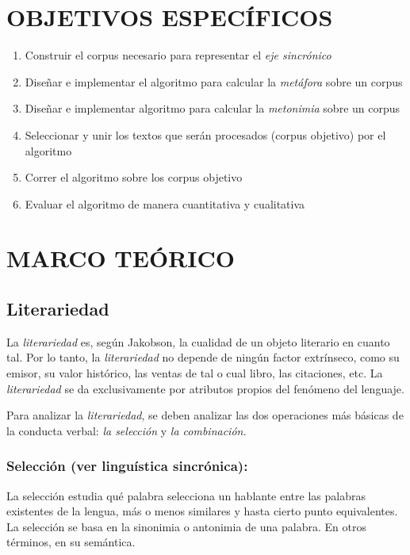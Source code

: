 \documentclass[twoside]{article}
\begin{document}
\section{OBJETIVOS ESPECÍFICOS}
\label{sec:org8cae7c8}

\begin{enumerate}
\item Construir el corpus necesario para representar el \emph{eje sincrónico}
\item Diseñar e implementar el algoritmo para calcular la \emph{metáfora} sobre un corpus
\item Diseñar e implementar algoritmo para calcular la \emph{metonimia} sobre un corpus
\item Seleccionar y unir los textos que serán procesados (corpus objetivo) por el algoritmo
\item Correr el algoritmo sobre los corpus objetivo
\item Evaluar el algoritmo de manera cuantitativa y cualitativa
\end{enumerate}

\section{MARCO TEÓRICO}
\label{sec:org919082e}

\subsection{Literariedad}
\label{sec:orge8a7210}


La \emph{literariedad} es, según Jakobson, la cualidad de un objeto
literario en cuanto tal. Por lo tanto, la \emph{literariedad} no depende de
ningún factor extrínseco, como su emisor, su valor histórico, las
ventas de tal o cual libro, las citaciones, etc. La \emph{literariedad} se
da exclusivamente por atributos propios del fenómeno del lenguaje.

Para analizar la \emph{literariedad}, se deben analizar las dos operaciones
más básicas de la conducta verbal: \emph{la selección} y \emph{la combinación.}


\subsubsection{Selección (ver linguística sincrónica):}
\label{sec:org2a0e410}

La selección estudia qué palabra selecciona un hablante entre las
palabras existentes de la lengua, más o menos similares y hasta
cierto punto equivalentes. La selección se basa en la sinonimia o
antonimia de una palabra. En otros términos, en su semántica.
\end{document}
